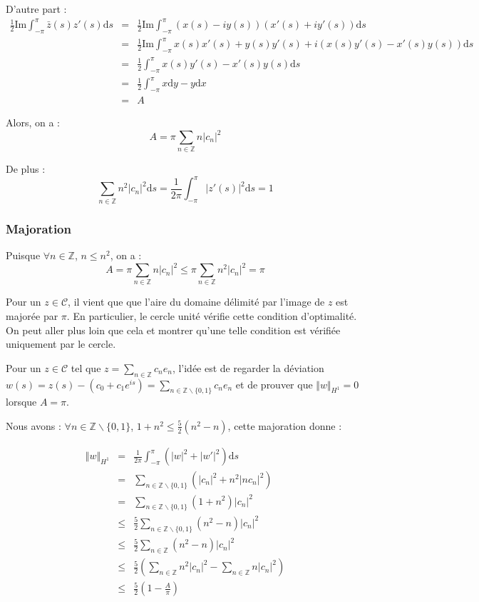 \documentclass[10pt,a4paper]{article}
\newcommand{\Z}{\mathbb{Z}}
\renewcommand{\d}{\mathrm{d}}
\renewcommand{\Im}{\mathrm{Im}}
\theoremstyle{plain}
\theoremstyle{definition}
\begin{document}
D'autre part :
\begin{eqnarray*}
\frac{1}{2} \Im \int_{-\pi}^{\pi}{\bar{z}(s) z'(s) \d s} &=& \frac{1}{2} \Im \int_{-\pi}^{\pi}{(x(s)-iy(s)) (x'(s)+iy'(s)) \d s} \\
&=& \frac{1}{2} \Im \int_{-\pi}^{\pi}{x(s)x'(s)+y(s)y'(s) + i(x(s)y'(s)-x'(s)y(s)) \d s} \\
&=& \frac{1}{2} \int_{-\pi}^{\pi}{x(s)y'(s)-x'(s)y(s) \d s} \\
&=& \frac{1}{2} \int_{-\pi}^{\pi}{x\d y-y\d x} \\
&=& A
\end{eqnarray*}

Alors, on a :
\[ A =  \pi \sum_{n\in \Z}{ n |c_n|^2} \]

De plus :
\[ \sum_{n\in \Z}{n^2|c_n|^2} \d s = \frac{1}{2\pi} \int_{-\pi}^{\pi}{|z'(s)|^2\d s} = 1 \]

\subsubsection{Majoration}

Puisque $\forall n \in \Z$, $n \leqslant n^2$, on a :
\[ A = \pi \sum_{n\in \Z}{n|c_n|^2} \leqslant \pi \sum_{n\in \Z}{n^2|c_n|^2} = \pi  \]

Pour un $z \in \mathcal{C}$, il vient que que l'aire du domaine délimité par l'image de $z$ est majorée par $\pi$. En particulier, le cercle unité vérifie cette condition d'optimalité. On peut aller plus loin que cela et montrer qu'une telle condition est vérifiée uniquement par le cercle.


Pour un $z \in \mathcal{C}$ tel que $z=\sum_{n\in \Z}{c_ne_n}$, l'idée est de regarder la déviation $w(s) = z(s) - (c_0+c_1e^{is}) = \sum_{n\in \Z\backslash \{0,1\}}{c_ne_n}$ et de prouver que $\Vert w\Vert_{H^1} = 0$ lorsque $A=\pi$.

Nous avons : $\forall n \in \Z \backslash \{0,1\}$, $1+n^2 \leqslant \frac{5}{2} (n^2-n)$, cette majoration donne :

\begin{eqnarray*}
\Vert w\Vert_{H^1} &=& \frac{1}{2\pi} \int_{-\pi}^{\pi}{ (|w|^2+|w'|^2)\d s} \\
&=& \sum_{n\in \Z\backslash \{0,1\}}{(|c_n|^2+ n^2|nc_n|^2)} \\
&=& \sum_{n\in \Z\backslash \{0,1\}}{(1+n^2) |c_n|^2 } \\
&\leqslant& \frac{5}{2} \sum_{n\in \Z\backslash \{0,1\}}{(n^2-n) |c_n|^2 } \\
&\leqslant& \frac{5}{2} \sum_{n\in \Z}{(n^2-n) |c_n|^2 } \\
&\leqslant& \frac{5}{2} \left(\sum_{n\in \Z}{n^2|c_n|^2} - \sum_{n\in \Z}{n|c_n|^2 } \right) \\
&\leqslant& \frac{5}{2} \left(1 - \frac{A}{\pi}\right)
\end{eqnarray*}
\end{document}
